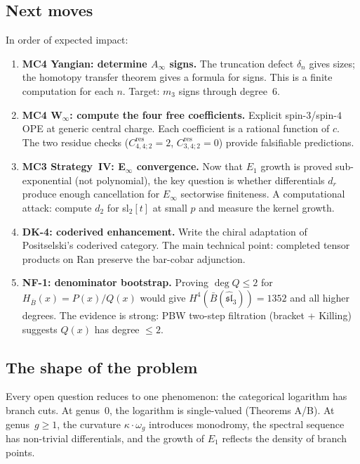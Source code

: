 \documentclass[11pt]{article}
\newcommand{\fsl}{\mathfrak{sl}}
\newcommand{\B}{\bar{B}}
\begin{document}
\subsection{Next moves}

In order of expected impact:

\begin{enumerate}
\item \textbf{MC4 Yangian: determine $A_\infty$ signs.}
  The truncation defect $\delta_n$ gives sizes; the homotopy transfer
  theorem gives a formula for signs.  This is a finite computation for
  each $n$.  Target: $m_3$ signs through degree~$6$.

\item \textbf{MC4 W$_\infty$: compute the four free coefficients.}
  Explicit spin-$3$/spin-$4$ OPE at generic central charge.  Each
  coefficient is a rational function of $c$.  The two residue checks
  ($C^{\mathrm{res}}_{4,4;2} = 2$, $C^{\mathrm{res}}_{3,4;2} = 0$)
  provide falsifiable predictions.

\item \textbf{MC3 Strategy~IV: E$_\infty$ convergence.}
  Now that $E_1$ growth is proved sub-exponential (not polynomial),
  the key question is whether differentials $d_r$ produce enough
  cancellation for $E_\infty$ sectorwise finiteness.  A computational
  attack: compute $d_2$ for sl$_2[t]$ at small $p$ and measure the
  kernel growth.

\item \textbf{DK-4: coderived enhancement.}
  Write the chiral adaptation of Positselski's coderived category.
  The main technical point: completed tensor products on Ran preserve
  the bar-cobar adjunction.

\item \textbf{NF-1: denominator bootstrap.}
  Proving $\deg Q \leq 2$ for $H_{\B}(x) = P(x)/Q(x)$ would give
  $H^4(\B(\widehat{\fsl}_3)) = 1352$ and all higher degrees.  The
  evidence is strong: PBW two-step filtration (bracket + Killing)
  suggests $Q(x)$ has degree $\leq 2$.
\end{enumerate}


\subsection{The shape of the problem}

Every open question reduces to one phenomenon: the categorical
logarithm has branch cuts.  At genus~$0$, the logarithm is
single-valued (Theorems A/B).  At genus~$g \geq 1$, the curvature
$\kappa\cdot\omega_g$ introduces monodromy, the spectral sequence
has non-trivial differentials, and the growth of $E_1$ reflects
the density of branch points.
\end{document}
